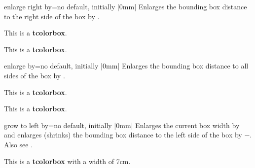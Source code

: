 \begin{docTcbKey}{enlarge right by}{=}{no default, initially |0mm|}
  Enlarges the bounding box distance to the right side of the box by .
\begin{dispExample}

\begin{tcolorbox}[enlarge right by=-2cm,width=\linewidth+2cm,
  enhanced,show bounding box]
This is a \textbf{tcolorbox}.
\end{tcolorbox}
\begin{tcolorbox}[enlarge right by=2cm,width=\linewidth-2cm]
This is a \textbf{tcolorbox}.
\end{tcolorbox}
\end{dispExample}
\end{docTcbKey}

\clearpage
\begin{docTcbKey}{enlarge by}{=}{no default, initially |0mm|}
  Enlarges the bounding box distance to all sides of the box by .
\begin{dispExample}

\begin{tcolorbox}
This is a \textbf{tcolorbox}.
\end{tcolorbox}
\begin{tcolorbox}[enlarge by=5mm,enhanced,show bounding box]
This is a \textbf{tcolorbox}.
\end{tcolorbox}
\end{dispExample}
\end{docTcbKey}


\begin{docTcbKey}{grow to left by}{=}{no default, initially |0mm|}
  Enlarges the current box width by  and
  enlarges (shrinks) the bounding box distance to the left side of the box by
  $-$. Also see .
\begin{dispExample}

\begin{tcolorbox}[width=5cm,grow to left by=2cm,enhanced,show bounding box]
This is a \textbf{tcolorbox} with a width of 7cm.
\end{tcolorbox}
\end{dispExample}
\end{docTcbKey}

